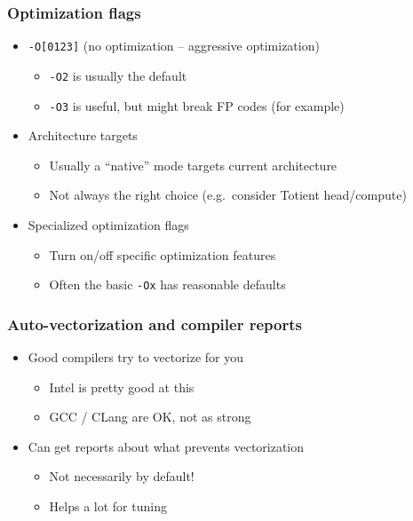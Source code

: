 \documentclass{beamer}
\begin{document}
\begin{frame}
  \frametitle{Optimization flags}

  \begin{itemize}
  \item {\tt -O[0123]} (no optimization -- aggressive optimization)
    \begin{itemize}
    \item {\tt -O2} is usually the default
    \item {\tt -O3} is useful, but might break FP codes (for example)
    \end{itemize}
  \item Architecture targets
    \begin{itemize}
    \item Usually a ``native'' mode targets current architecture
    \item Not always the right choice (e.g.~consider Totient head/compute)
    \end{itemize}
  \item Specialized optimization flags
    \begin{itemize}
    \item Turn on/off specific optimization features
    \item Often the basic {\tt -Ox} has reasonable defaults
    \end{itemize}
  \end{itemize}
  
\end{frame}


\begin{frame}
  \frametitle{Auto-vectorization and compiler reports}

  \begin{itemize}
  \item Good compilers try to vectorize for you
    \begin{itemize}
    \item Intel is pretty good at this
    \item GCC / CLang are OK, not as strong
    \end{itemize}
  \item Can get reports about what prevents vectorization
    \begin{itemize}
    \item Not necessarily by default!
    \item Helps a lot for tuning
    \end{itemize}
  \end{itemize}
\end{frame}
\end{document}
